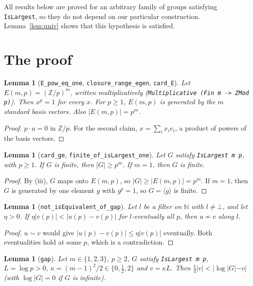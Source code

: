 \documentclass[11pt]{article}
\newtheorem{lemma}[theorem]{Lemma}
\theoremstyle{definition}
\theoremstyle{remark}
\begin{document}
All results below are proved for an arbitrary family of groups satisfying \texttt{IsLargest}, so
they do not depend on our particular construction. Lemma~\ref{lem:univ} shows that this hypothesis
is satisfied.

\section{The proof}

\begin{lemma}[\texttt{E\_pow\_eq\_one}, \texttt{closure\_range\_egen}, \texttt{card\_E}]
Let $E(m,p)=(\mathbb{Z}/p)^m$, written multiplicatively (\texttt{Multiplicative (Fin m -> ZMod p)}).
Then $x^p=1$ for every $x$. For $p\ge1$, $E(m,p)$ is generated by the $m$ standard basis vectors.
Also $|E(m,p)|=p^m$.
\end{lemma}

\begin{proof}
$p\cdot a=0$ in $\mathbb{Z}/p$. For the second claim, $x=\sum_i x_i e_i$, a product of powers of
the basis vectors.
\end{proof}

\begin{lemma}[\texttt{card\_ge}, \texttt{finite\_of\_isLargest\_one}]\label{lem:card}
Let $G$ satisfy \texttt{IsLargest m p}, with $p\ge1$. If $G$ is finite, then $|G|\ge p^m$. If
$m=1$, then $G$ is finite.
\end{lemma}

\begin{proof}
By (iii), $G$ maps onto $E(m,p)$, so $|G|\ge|E(m,p)|=p^m$. If $m=1$, then $G$ is generated by one
element $g$ with $g^p=1$, so $G=\langle g\rangle$ is finite.
\end{proof}

\begin{lemma}[\texttt{not\_isEquivalent\_of\_gap}]
Let $l$ be a filter on $\mathbb{N}$ with $l\ne\bot$, and let $\eta>0$. If
$\eta|v(p)|<|u(p)-v(p)|$ for $l$-eventually all $p$, then $u\not\sim v$ along $l$.
\end{lemma}

\begin{proof}
$u\sim v$ would give $|u(p)-v(p)|\le\eta|v(p)|$ eventually. Both eventualities hold at some $p$,
which is a contradiction.
\end{proof}

\begin{lemma}[\texttt{gap}]\label{lem:gap}
Let $m\in\{1,2,3\}$, $p\ge 2$, $G$ satisfy \texttt{IsLargest m p}, $L=\log p>0$,
$\kappa=(m-1)^2/2\in\{0,\frac12,2\}$ and $v=\kappa L$. Then
$\tfrac14|v|<|\log|G|-v|$ (with $\log|G|=0$ if $G$ is infinite).
\end{lemma}
\end{document}
